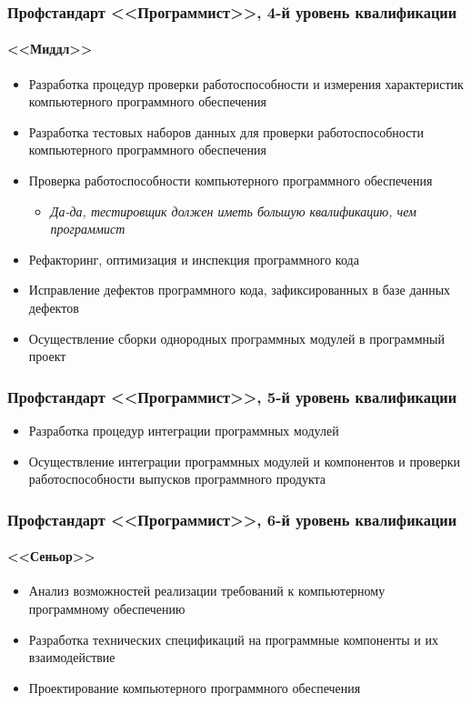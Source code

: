 \documentclass{../../slides-style}
\begin{document}
    \begin{frame}
        \frametitle{Профстандарт <<Программист>>, 4-й уровень квалификации}
        \framesubtitle{<<Миддл>>}
        \begin{itemize}
            \item Разработка процедур проверки работоспособности и измерения характеристик компьютерного программного обеспечения
            \item Разработка тестовых наборов данных для проверки работоспособности компьютерного программного обеспечения
            \item Проверка работоспособности компьютерного программного обеспечения
            \begin{itemize}
                \item \emph{Да-да, тестировщик должен иметь большую квалификацию, чем программист}
            \end{itemize}
            \item Рефакторинг, оптимизация и инспекция программного кода
            \item Исправление дефектов программного кода, зафиксированных в базе данных дефектов
            \item Осуществление сборки однородных программных модулей в программный проект
        \end{itemize}
    \end{frame}

    \begin{frame}
        \frametitle{Профстандарт <<Программист>>, 5-й уровень квалификации}
        \begin{itemize}
            \item Разработка процедур интеграции программных модулей
            \item Осуществление интеграции программных модулей и компонентов и проверки работоспособности выпусков программного продукта
        \end{itemize}
    \end{frame}

    \begin{frame}
        \frametitle{Профстандарт <<Программист>>, 6-й уровень квалификации}
        \framesubtitle{<<Сеньор>>}
        \begin{itemize}
            \item Анализ возможностей реализации требований к компьютерному программному обеспечению
            \item Разработка технических спецификаций на программные компоненты и их взаимодействие
            \item Проектирование компьютерного программного обеспечения
        \end{itemize}
    \end{frame}
\end{document}
